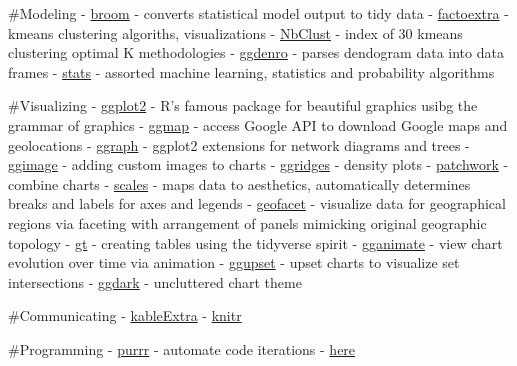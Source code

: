 \documentclass[
]{article}
\begin{document}
\#Modeling - \href{http://varianceexplained.org/r/broom-intro/}{broom} -
converts statistical model output to tidy data -
\href{https://www.rdocumentation.org/packages/factoextra/versions/1.0.3}{factoextra}
- kmeans clustering algoriths, visualizations -
\href{https://www.rdocumentation.org/packages/NbClust/versions/3.0/topics/NbClust}{NbClust}
- index of 30 kmeans clustering optimal K methodologies -
\href{https://cran.r-project.org/web/packages/ggdendro/vignettes/ggdendro.html}{ggdenro}
- parses dendogram data into data frames -
\href{https://www.rdocumentation.org/packages/stats/versions/3.6.2}{stats}
- assorted machine learning, statistics and probability algorithms

\#Visualizing - \href{https://ggplot2.tidyverse.org/}{ggplot2} - R's
famous package for beautiful graphics usibg the grammar of graphics -
\href{https://www.rdocumentation.org/packages/ggmap/versions/3.0.0}{ggmap}
- access Google API to download Google maps and geolocations -
\href{https://github.com/thomasp85/ggraph}{ggraph} - ggplot2 extensions
for network diagrams and trees -
\href{https://guangchuangyu.github.io/pkgdocs/ggimage.html}{ggimage} -
adding custom images to charts -
\href{https://wilkelab.org/ggridges/articles/introduction.html}{ggridges}
- density plots -
\href{https://www.rdocumentation.org/packages/patchwork/versions/1.0.0/topics/patchwork-package}{patchwork}
- combine charts -
\href{https://cran.r-project.org/web/packages/scales/scales.pdf}{scales}
- maps data to aesthetics, automatically determines breaks and labels
for axes and legends -
\href{https://hafen.github.io/geofacet/}{geofacet} - visualize data for
geographical regions via faceting with arrangement of panels mimicking
original geographic topology - \href{https://gt.rstudio.com/}{gt} -
creating tables using the tidyverse spirit -
\href{https://gganimate.com/}{gganimate} - view chart evolution over
time via animation - \href{https://github.com/Ryo-N7/ggupset}{ggupset} -
upset charts to visualize set intersections -
\href{https://cran.r-project.org/web/packages/ggdark/readme/README.html}{ggdark}
- uncluttered chart theme

\#Communicating -
\href{https://haozhu233.github.io/kableExtra/awesome_table_in_html.html}{kableExtra}
- \href{https://yihui.org/knitr/}{knitr}

\#Programming -
\href{https://towardsdatascience.com/functional-programming-in-r-with-purrr-469e597d0229}{purrr}
- automate code iterations -
\href{https://www.rdocumentation.org/packages/here/versions/0.1}{here}
\end{document}

